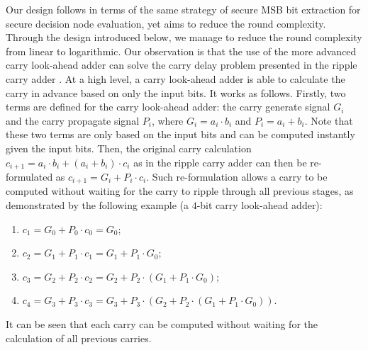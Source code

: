 \documentclass[10pt,journal,compsoc]{IEEEtran}
\begin{document}
Our design follows \cite{ZhengDWWN20} in terms of the same strategy of secure MSB bit extraction for secure decision node evaluation, yet aims to reduce the round complexity.
%
Through the design introduced below, we manage to reduce the round complexity from linear to logarithmic.
%
Our observation is that the use of the more advanced carry look-ahead adder can solve the carry delay problem presented in the ripple carry adder \cite{DHarris03}.
%
%
At a high level, a carry look-ahead adder is able to calculate the carry in advance based on only the input bits.
%
It works as follows.
%
Firstly, two terms are defined for the carry look-ahead adder: the carry generate signal $G_i$ and the carry propagate signal $P_i$, where $G_i=a_i\cdot b_i$ and $P_i=a_i+b_i$.
%
Note that these two terms are only based on the input bits and can be computed instantly given the input bits.
%
Then, the original carry calculation $c_{i+1}=a_i\cdot b_i+(a_i+b_i)\cdot c_i$ as in the ripple carry adder can then be re-formulated as $c_{i+1}=G_i+P_i\cdot c_i$.
%
Such re-formulation allows a carry to be computed without waiting for the carry to ripple through all previous stages, as demonstrated by the following example (a $4$-bit carry look-ahead adder):






\begin{enumerate}

\item $c_1=G_0+P_0\cdot c_0=G_0$;
\item $c_2=G_1+P_1\cdot c_1=G_1+P_1\cdot G_0$;
\item $c_3=G_2+P_2\cdot c_2=G_2+P_2\cdot (G_1+P_1\cdot G_0)$; 
\item $c_4=G_3+P_3\cdot c_3=G_3+P_3\cdot (G_2+P_2\cdot (G_1+P_1\cdot G_0))$.
\end{enumerate}



It can be seen that each carry can be computed without waiting for the calculation of all previous carries.
%
\end{document}
